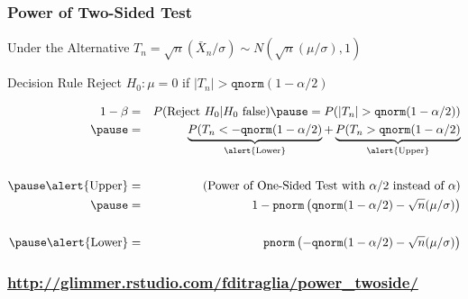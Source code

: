 \documentclass[handout]{beamer}
\begin{document}
\begin{frame}
	\frametitle{Power of Two-Sided Test}
\footnotesize
\begin{block}
	{Under the Alternative}
	$T_n = \sqrt{n}(\bar{X}_n/\sigma) \sim N\left( \sqrt{n}(\mu/\sigma),1  \right)$
\end{block}
\begin{block}
	{Decision Rule}
	Reject $H_0\colon \mu = 0$ if $|T_n|> \texttt{qnorm}(1- \alpha/2)$  
\end{block}
\begin{eqnarray*}
	1 - \beta &=& P(\mbox{Reject } H_0|H_0 \mbox{ false}) \pause = P(|T_n| >\texttt{qnorm}(1- \alpha/2))\\ \pause
		&=&\underbrace{P(T_n < -\texttt{qnorm}(1- \alpha/2)}_{\text{\alert{Lower}}} + \underbrace{P(T_n >\texttt{qnorm}(1- \alpha/2)}_{\text{\alert{Upper}}}\\ \\ \pause
	\mbox{\alert{Upper}} &=& (\mbox{Power of One-Sided Test with } \alpha/2 \mbox{ instead of } \alpha)\\ \pause
		&=& 1 - \texttt{pnorm}\left( \texttt{qnorm}(1 - \alpha/2) - \sqrt{n}(\mu/\sigma) \right) \\ \\ \pause
	\mbox{\alert{Lower}} &=& \texttt{pnorm}\left(-\texttt{qnorm}(1 - \alpha/2) - \sqrt{n}(\mu/\sigma) \right) \\
\end{eqnarray*}

\end{frame}
\begin{frame}
	\frametitle{\href{http://glimmer.rstudio.com/fditraglia/power_twoside/}{http://glimmer.rstudio.com/fditraglia/power\_twoside/}}

\begin{figure}
\end{figure}

\end{frame}
\end{document}
